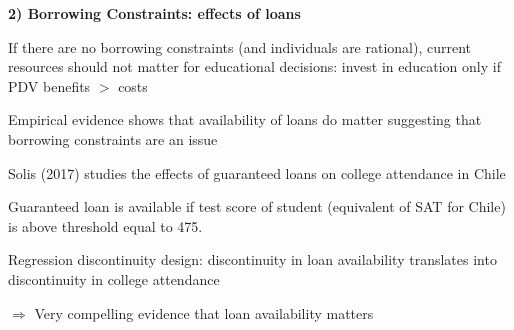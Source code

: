 \documentclass[landscape]{slides}
\begin{document}
\begin{slide}
\begin{center}
{\bf 2) Borrowing Constraints: effects of loans}
\end{center}
If there are no borrowing constraints (and individuals are rational), current resources
should not matter for educational decisions: invest in education only if PDV benefits $>$ costs

Empirical evidence shows that availability of loans do matter suggesting that borrowing constraints
are an issue

Solis (2017) studies the effects of guaranteed loans on college attendance in Chile

Guaranteed loan is available if test score of student (equivalent of SAT for Chile) is above threshold
equal to 475.

Regression discontinuity design: discontinuity in loan availability translates into discontinuity in college
attendance

$\Rightarrow$ Very compelling evidence that loan availability matters 

\end{slide}

\begin{slide}

\end{slide}

\begin{slide}

\end{slide}


%

%
%
%
%
%
%
%
%
%
\end{document}

